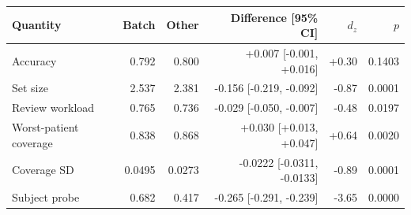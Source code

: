 \begin{tabular}{lrrrrr}
\toprule
Quantity & Batch & Other & Difference [95\% CI] & $d_z$ & $p$ \\
\midrule
Accuracy & 0.792 & 0.800 & +0.007 [-0.001, +0.016] & +0.30 & 0.1403 \\
Set size & 2.537 & 2.381 & -0.156 [-0.219, -0.092] & -0.87 & 0.0001 \\
Review workload & 0.765 & 0.736 & -0.029 [-0.050, -0.007] & -0.48 & 0.0197 \\
Worst-patient coverage & 0.838 & 0.868 & +0.030 [+0.013, +0.047] & +0.64 & 0.0020 \\
Coverage SD & 0.0495 & 0.0273 & -0.0222 [-0.0311, -0.0133] & -0.89 & 0.0001 \\
Subject probe & 0.682 & 0.417 & -0.265 [-0.291, -0.239] & -3.65 & 0.0000 \\
\bottomrule
\end{tabular}